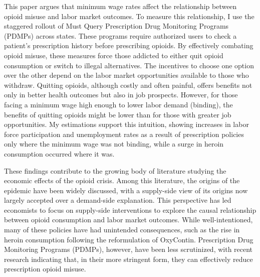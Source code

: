 \documentclass[12pt,a4paper]{article}
\begin{document}

\begin{comment}
    MORITZ:
    What do you mean by recent? %
    Why so-called? 
    Is it important that you mention non-college educated people NOW?
    I think you need a better connection from opioid deaths to the study of labor market regulations
    I am not sure you have to talk about labor market regulation in general terms at all, you can immediately go into minimum wage rates that is very interesting in its own right %
    I think I know the connection between low education levels and minimum wage rates (based on bindingness) but the connection here could be clearer
    I have questions about the importance of access to opioids in driving the epidemic
\end{comment}

This paper argues that minimum wage rates affect the relationship between opioid misuse and labor market outcomes.
To measure this relationship, I use the staggered rollout of Must Query Prescription Drug Monitoring Programs (PDMPs) across states.
These programs require authorized users to check a patient's prescription history before prescribing opioids.
By effectively combating opioid misuse, these measures force those addicted to either quit opioid consumption or switch to illegal alternatives.
The incentives to choose one option over the other depend on the labor market opportunities available to those who withdraw. 
Quitting opioids, although costly and often painful, offers benefits not only in better health outcomes but also in job prospects. 
However, for those facing a minimum wage high enough to lower labor demand (binding), the benefits of quitting opioids might be lower than for those with greater job opportunities.
My estimations support this intuition, showing increases in labor force participation and unemployment rates as a result of prescription policies only where the minimum wage was not binding, while a surge in heroin consumption occurred where it was.


These findings contribute to the growing body of literature studying the economic effects of the opioid crisis.
Among this literature, the origins of the epidemic have been widely discussed, with a supply-side view of its origins now largely accepted over a demand-side explanation.
This perspective has led economists to focus on supply-side interventions to explore the causal relationship between opioid consumption and labor market outcomes.
While well-intentioned, many of these policies have had unintended consequences, such as the rise in heroin consumption following the reformulation of OxyContin.
Prescription Drug Monitoring Programs (PDMPs), however, have been less scrutinized, with recent research indicating that, in their more stringent form, they can effectively reduce prescription opioid misuse.
\end{document}
